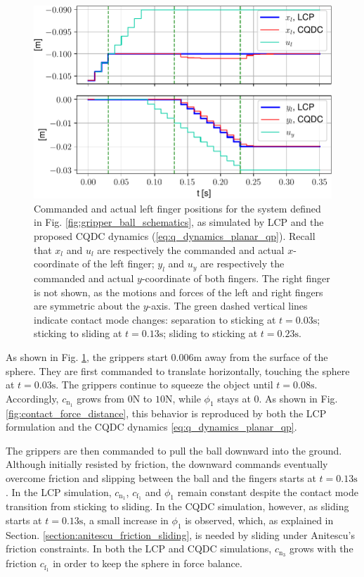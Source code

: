 \begin{figure}
\centering
\includegraphics[width=0.75\linewidth]{figures/02_quasi_static_dynamics/xy_cmd_vs_xy_true.pdf}
\caption{Commanded and actual left finger positions for the system defined in Fig. \ref{fig:gripper_ball_schematics}, as simulated by LCP and the proposed CQDC dynamics (\ref{eq:q_dynamics_planar_qp}). 
Recall that $x_l$ and $u_l$ are respectively the commanded and actual $x$-coordinate of the left finger; $y_l$ and $u_y$ are respectively the commanded and actual $y$-coordinate of both fingers.
The right finger is not shown, as the motions and forces of the left and right fingers are symmetric about the $y$-axis. 
The green dashed vertical lines indicate contact mode changes: separation to sticking at $t=0.03\mathrm{s}$; sticking to sliding at $t=0.13\mathrm{s}$; sliding to sticking at $t=0.23\mathrm{s}$.}
\label{fig:xy_cmd_vs_xy_true}
\vspace{-0.5cm}
\end{figure}

As shown in Fig. \ref{fig:xy_cmd_vs_xy_true}, the grippers start $0.006\mathrm{m}$ away from the surface of the sphere. They are first commanded to translate horizontally, touching the sphere at $t = 0.03\mathrm{s}$. The grippers continue to squeeze the object until $t = 0.08 \mathrm{s}$. Accordingly, $c_{\mathrm{n}_1}$ grows from $0\mathrm{N}$ to $10\mathrm{N}$, while $\phi_1$ stays at 0. As shown in Fig. \ref{fig:contact_force_distance}, this behavior is reproduced by both the LCP formulation and the CQDC dynamics \eqref{eq:q_dynamics_planar_qp}.

The grippers are then commanded to pull the ball downward into the ground. Although initially resisted by friction, the downward commands eventually overcome friction and slipping between the ball and the fingers starts at $t = 0.13 \mathrm{s}$. In the LCP simulation, $c_{\mathrm{n}_1}$, $c_{\mathrm{f}_1}$ and $\phi_1$ remain constant despite the contact mode transition from sticking to sliding. In the CQDC simulation, however, as sliding starts at $t = 0.13 \mathrm{s}$, a small increase in $\phi_1$ is observed, which, as explained in Section. \ref{section:anitescu_friction_sliding}, is needed by sliding under Anitescu's friction constraints. In both the LCP and CQDC simulations, $c_{\mathrm{n}_3}$ grows with the friction $c_{\mathrm{f}_1}$ in order to keep the sphere in force balance.

